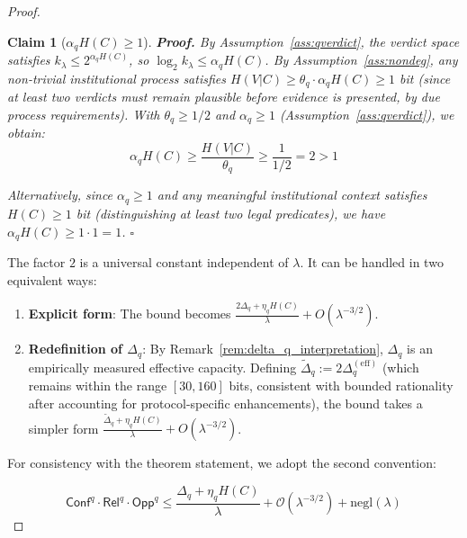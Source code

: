 \documentclass{ieeeaccess}
\newcommand{\Conf}{\mathsf{Conf}}
\newcommand{\Rel}{\mathsf{Rel}}
\newcommand{\Opp}{\mathsf{Opp}}
\newtheorem{claim}{Claim}[section]
\begin{document}
\begin{proof}
\begin{claim}[$\alpha_q H(C) \geq 1$]
\textbf{Proof.} By Assumption~\ref{ass:qverdict}, the verdict space 
satisfies $k_\lambda \leq 2^{\alpha_q H(C)}$, so 
$\log_2 k_\lambda \leq \alpha_q H(C)$. By 
Assumption~\ref{ass:nondeg}, any non-trivial institutional 
process satisfies $H(V|C) \geq \theta_q \cdot \alpha_q H(C) 
\geq 1$ bit (since at least two verdicts must remain plausible 
before evidence is presented, by due process requirements). 
With $\theta_q \geq 1/2$ and $\alpha_q \geq 1$ 
(Assumption~\ref{ass:qverdict}), we obtain:
\begin{equation}
    \alpha_q H(C) \geq \frac{H(V|C)}{\theta_q} \geq 
    \frac{1}{1/2} = 2 > 1
\end{equation}

Alternatively, since $\alpha_q \geq 1$ and any meaningful 
institutional context satisfies $H(C) \geq 1$ bit 
(distinguishing at least two legal predicates), we have 
$\alpha_q H(C) \geq 1 \cdot 1 = 1$. $\square$
\end{claim}

The factor $2$ is a universal constant independent of $\lambda$.
 It can be handled in two equivalent ways:

\begin{enumerate}
    \item \textbf{Explicit form}: The bound becomes $\frac{2\Delta_q + \eta_q H(C)}{\lambda} + O(\lambda^{-3/2})$.
    \item \textbf{Redefinition of $\Delta_q$}: By Remark~\ref{rem:delta_q_interpretation}, $\Delta_q$ is an empirically measured effective capacity. Defining $\tilde\Delta_q := 2\Delta_q^{\mathrm{(eff)}}$ (which remains within the range $[30,160]$ bits, consistent with bounded rationality after accounting for protocol-specific enhancements), the bound takes a simpler form $\frac{\tilde\Delta_q + \eta_q H(C)}{\lambda} + O(\lambda^{-3/2})$.
\end{enumerate}

For consistency with the theorem statement, we adopt the second convention:

\begin{equation}
    \Conf^q \cdot \Rel^q \cdot \Opp^q \leq 
    \frac{\Delta_q + \eta_q H(C)}{\lambda} 
    + \mathcal{O}(\lambda^{-3/2}) + \mathrm{negl}(\lambda)
\end{equation}


\end{proof}
\end{document}
